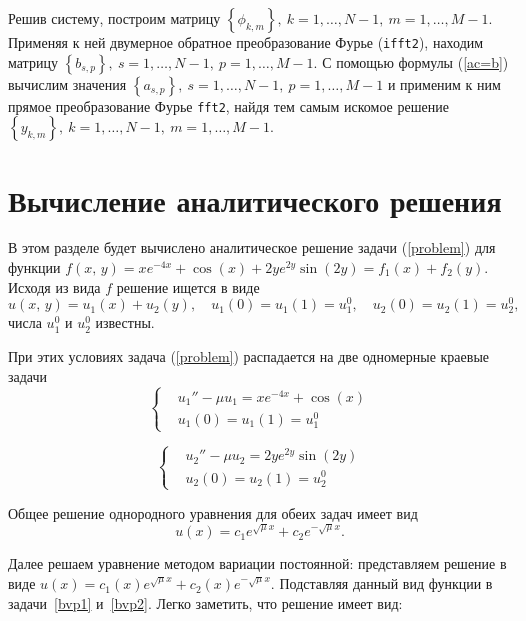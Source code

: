 \documentclass[12pt, a4paper]{article} %
\begin{document}
Решив систему, построим матрицу $\left\{\phi_{k,m}\right\},\ k = 1,\ldots,N-1, \ m = 1,\ldots,M-1$.
Применяя к ней двумерное обратное преобразование Фурье (\texttt{ifft2}), находим матрицу
 $\left\{b_{s,p}\right\},\ s = 1,\ldots,N-1, \ p = 1,\ldots,M-1$.
С помощью формулы (\ref{ac=b}) вычислим значения $\left\{a_{s,p}\right\},\ s = 1,\ldots,N-1, \ p = 1,\ldots,M-1$ и применим к ним
прямое преобразование Фурье \texttt{fft2}, найдя тем самым искомое решение 
$\left\{y_{k,m}\right\},\ k = 1,\ldots,N-1, \ m = 1,\ldots,M-1$.

\section {Вычисление аналитического решения}

В этом разделе будет вычислено аналитическое решение задачи (\ref{problem}) для функции 
$f\left(x, \, y\right) = xe^{-4x} + \cos(x) + 2y e^{2y}\sin(2y) = f_1(x) + f_2(y).$ Исходя из вида $f$ решение ищется в виде 
$$u(x, \, y) = u_1(x) + u_2(y), \quad u_1(0) = u_1(1) = u_1^0, \quad u_2(0) = u_2(1) = u_2^0,$$
числа $u_1^0$ и $u_2^0$ известны.

При этих условиях задача (\ref{problem}) распадается на две одномерные краевые задачи
\begin{equation}
\left\{
	\begin{aligned}
	& u_1''-\mu u_1 = xe^{-4x} + \cos(x) \label{bvp1} \\
	& u_1(0) = u_1(1) = u_1^0 
	\end{aligned}	
\right.
\end{equation}

\begin{equation}
\left\{
	\begin{aligned}
	& u_2''-\mu u_2 = 2y e^{2y}\sin(2y) \label{bvp2} \\
	& u_2(0) = u_2(1) = u_2^0 
	\end{aligned}	
\right.
\end{equation}

Общее решение однородного уравнения для обеих задач имеет вид
$$u(x) = c_1 e^{\sqrt{\mu}x} + c_2 e^{-\sqrt{\mu}x}.$$

Далее решаем уравнение методом вариации постоянной: представляем решение в виде 
$u(x) = c_1(x) e^{\sqrt{\mu}x} + c_2(x) e^{-\sqrt{\mu}x}.$
Подставляя данный вид функции в задачи~\eqref{bvp1} и~\eqref{bvp2}.
Легко заметить, что решение имеет вид:
\end{document}

